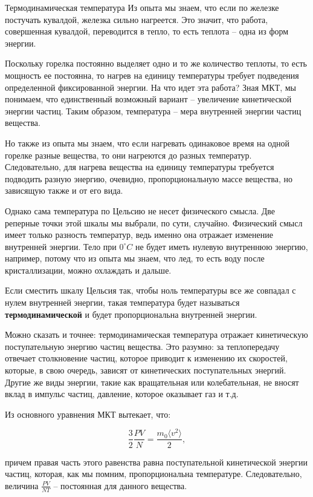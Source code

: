 \documentclass{article}
\begin{document}
\begin{section}{Термодинамическая температура}
		Из опыта мы знаем, что если по железке постучать кувалдой, железка сильно нагреется. Это значит, что работа, совершенная кувалдой, переводится в тепло, то есть теплота -- одна из форм энергии.

		Поскольку горелка постоянно выделяет одно и то же количество теплоты, то есть мощность ее постоянна, то нагрев на единицу температуры требует подведения определенной фиксированной энергии. На что идет эта работа? Зная МКТ, мы понимаем, что единственный возможный вариант -- увеличение кинетической энергии частиц. Таким образом, температура -- мера внутренней энергии частиц вещества.

		Но также из опыта мы знаем, что если нагревать одинаковое время на одной горелке разные вещества, то они нагреются до разных температур. Следовательно, для нагрева вещества на единицу температуры требуется подводить разную энергию, очевидно, пропорциональную массе вещества, но зависящую также и от его вида.

		Однако сама температура по Цельсию не несет физического смысла. Две реперные точки этой шкалы мы выбрали, по сути, случайно. Физический смысл имеет только разность температур, ведь именно она отражает изменение внутренней энергии. Тело при $0 ^\circ C$ не будет иметь нулевую внутреннюю энергию, например, потому что из опыта мы знаем, что лед, то есть воду после кристаллизации, можно охлаждать и дальше.

		Если сместить шкалу Цельсия так, чтобы ноль температуры все же совпадал с нулем внутренней энергии, такая температура будет называться \textbf{термодинамической} и будет пропорциональна внутренней энергии.

		Можно сказать и точнее: термодинамическая температура отражает кинетическую поступательную энергию частиц вещества. Это разумно: за теплопередачу отвечает столкновение частиц, которое приводит к изменению их скоростей, которые, в свою очередь, зависят от кинетических поступательных энергий. Другие же виды энергии, такие как вращательная или колебательная, не вносят вклад в импульс частиц, давление, которое оказывает газ и т.д.

		Из основного уравнения МКТ вытекает, что:

		\begin{equation*}
			\frac{3}{2} \frac{PV}{N} = \frac{m_0 \langle v^2 \rangle}{2},
		\end{equation*}

		причем правая часть этого равенства равна поступательной кинетической энергии частиц, которая, как мы помним, пропорциональна температуре. Следовательно, величина $\frac{PV}{NT}$ -- постоянная для данного вещества.


\end{section}
\end{document}
